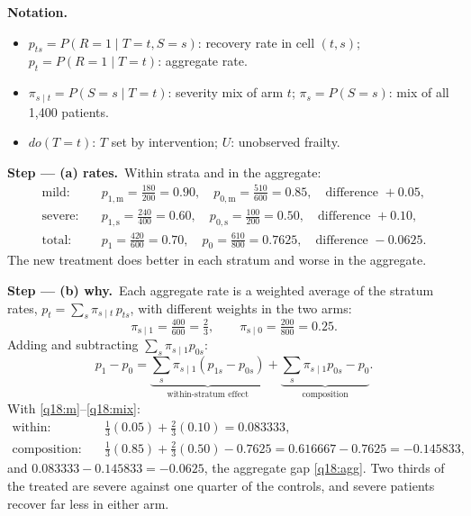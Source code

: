 \documentclass[11pt,a4paper]{article}
\newenvironment{notacao}{\par\smallskip\noindent\textbf{Notation.}\begin{itemize}[leftmargin=1.4em,topsep=1pt,itemsep=0pt]\small}{\end{itemize}}
\newcommand{\passo}[2]{\par\smallskip\noindent\textbf{Step --- #1.}~#2}
\begin{document}
\begin{sol}
\begin{notacao}
\item $p_{ts}=P(R=1\mid T=t,S=s)$: recovery rate in cell $(t,s)$; $p_t=P(R=1\mid T=t)$: aggregate rate.
\item $\pi_{s\mid t}=P(S=s\mid T=t)$: severity mix of arm $t$; $\pi_s=P(S=s)$: mix of all 1,400 patients.
\item $do(T=t)$: $T$ set by intervention; $U$: unobserved frailty.
\end{notacao}

\passo{(a) rates}{Within strata and in the aggregate:
\begin{align}
\text{mild:}&\quad p_{1,\text{m}}=\tfrac{180}{200}=0.90,\quad p_{0,\text{m}}=\tfrac{510}{600}=0.85,\quad\text{difference }+0.05,\label{q18:m}\\
\text{severe:}&\quad p_{1,\text{s}}=\tfrac{240}{400}=0.60,\quad p_{0,\text{s}}=\tfrac{100}{200}=0.50,\quad\text{difference }+0.10,\label{q18:s}\\
\text{total:}&\quad p_1=\tfrac{420}{600}=0.70,\quad p_0=\tfrac{610}{800}=0.7625,\quad\text{difference }-0.0625.\label{q18:agg}
\end{align}
The new treatment does better in each stratum and worse in the aggregate.}

\passo{(b) why}{Each aggregate rate is a weighted average of the stratum rates, $p_t=\sum_s\pi_{s\mid t}\,p_{ts}$,
with different weights in the two arms:
\begin{equation}
\pi_{\text{s}\mid1}=\tfrac{400}{600}=\tfrac23,\qquad \pi_{\text{s}\mid0}=\tfrac{200}{800}=0.25.\label{q18:mix}
\end{equation}
Adding and subtracting $\sum_s\pi_{s\mid1}p_{0s}$:
\begin{equation}
p_1-p_0=\underbrace{\sum_s\pi_{s\mid1}(p_{1s}-p_{0s})}_{\text{within-stratum effect}}+\underbrace{\sum_s\pi_{s\mid1}p_{0s}-p_0}_{\text{composition}}.\label{q18:dec}
\end{equation}
With \eqref{q18:m}--\eqref{q18:mix}:
\begin{align}
\text{within:}&\quad\tfrac13(0.05)+\tfrac23(0.10)=0.083333,\label{q18:att}\\
\text{composition:}&\quad\tfrac13(0.85)+\tfrac23(0.50)-0.7625=0.616667-0.7625=-0.145833,\label{q18:comp}
\end{align}
and $0.083333-0.145833=-0.0625$, the aggregate gap \eqref{q18:agg}. Two thirds of the treated are severe
against one quarter of the controls, and severe patients recover far less in either arm.}


\end{sol}
\end{document}
